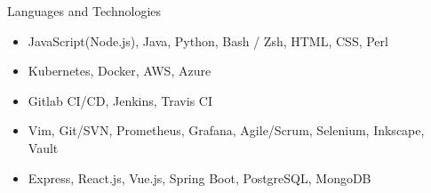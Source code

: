 \documentclass[]{lau}
\begin{document}
	\begin{cvsection}{Languages and Technologies}
		\begin{cvsubsection}{}{}{}
			\begin{itemize}
				\item JavaScript(Node.js), Java, Python, Bash / Zsh, HTML, CSS, Perl
				\item Kubernetes, Docker, AWS, Azure
				\item Gitlab CI/CD, Jenkins, Travis CI
				\item Vim, Git/SVN, Prometheus, Grafana, Agile/Scrum, Selenium, Inkscape, Vault
				\item Express, React.js, Vue.js, Spring Boot, PostgreSQL, MongoDB
			\end{itemize}
		\end{cvsubsection}
	\end{cvsection}
\end{document}
